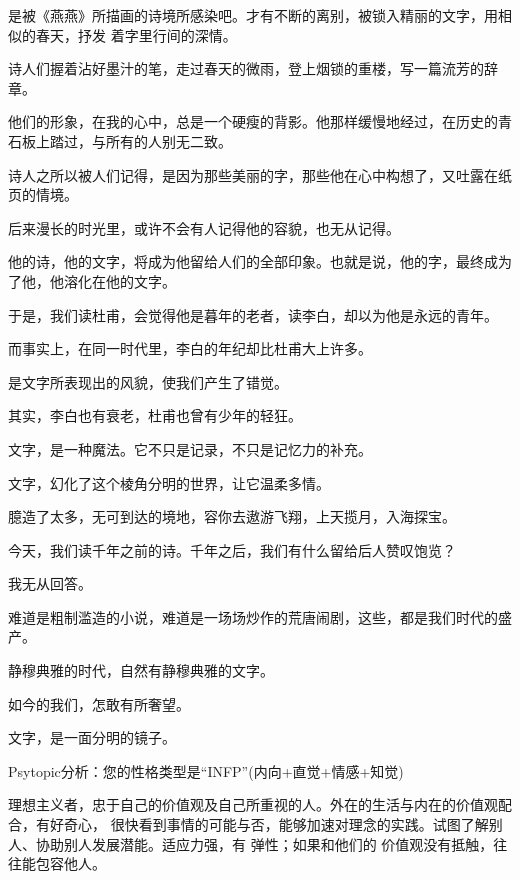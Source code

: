 		是被《燕燕》所描画的诗境所感染吧。才有不断的离别，被锁入精丽的文字，用相似的春天，抒发
	着字里行间的深情。

		\vspace{1em}
		诗人们握着沾好墨汁的笔，走过春天的微雨，登上烟锁的重楼，写一篇流芳的辞章。\par
		他们的形象，在我的心中，总是一个硬瘦的背影。他那样缓慢地经过，在历史的青石板上踏过，与所有的人别无二致。\par
		诗人之所以被人们记得，是因为那些美丽的字，那些他在心中构想了，又吐露在纸页的情境。\par
		后来漫长的时光里，或许不会有人记得他的容貌，也无从记得。\par
		他的诗，他的文字，将成为他留给人们的全部印象。也就是说，他的字，最终成为了他，他溶化在他的文字。\par
		于是，我们读杜甫，会觉得他是暮年的老者，读李白，却以为他是永远的青年。\par
		而事实上，在同一时代里，李白的年纪却比杜甫大上许多。\par
		是文字所表现出的风貌，使我们产生了错觉。\par
		其实，李白也有衰老，杜甫也曾有少年的轻狂。

		\vspace{1em}
		文字，是一种魔法。它不只是记录，不只是记忆力的补充。\par
		文字，幻化了这个棱角分明的世界，让它温柔多情。\par
		臆造了太多，无可到达的境地，容你去遨游飞翔，上天揽月，入海探宝。\par
		今天，我们读千年之前的诗。千年之后，我们有什么留给后人赞叹饱览？\par
		我无从回答。\par
		难道是粗制滥造的小说，难道是一场场炒作的荒唐闹剧，这些，都是我们时代的盛产。

		\vspace{1em}
		静穆典雅的时代，自然有静穆典雅的文字。\par
		如今的我们，怎敢有所奢望。\par
		文字，是一面分明的镜子。

	\endwriting



		Psytopic分析：您的性格类型是“INFP”(内向+直觉+情感+知觉)

		理想主义者，忠于自己的价值观及自己所重视的人。外在的生活与内在的价值观配合，有好奇心，
	很快看到事情的可能与否，能够加速对理念的实践。试图了解别人、协助别人发展潜能。适应力强，有
	弹性；如果和他们的 价值观没有抵触，往往能包容他人。

